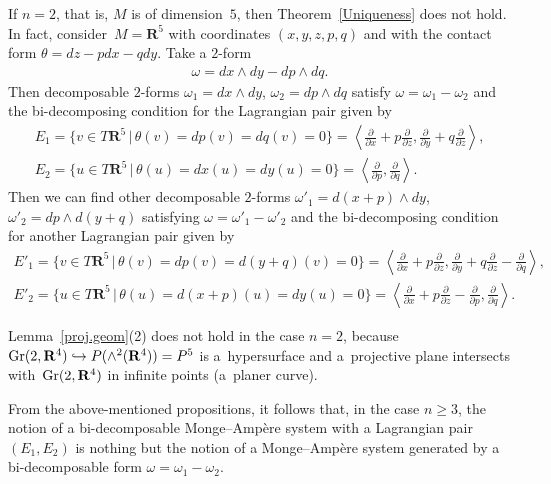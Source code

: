 \documentclass[pdftex]{sigma}
\begin{document}
\begin{Rem}
\label{n=2}
If $n=2$, that is, $M$ is of dimension~$5$,
then Theorem~\ref{Uniqueness} does not hold.
In fact, consider~$M={\mathbf{R}}^5$ with coordinates $(x,y,z,p,q)$
and with the contact form $\theta=dz-pdx-qdy$.
Take a $2$-form
\begin{gather*}
\omega=dx\wedge dy-dp\wedge dq.
\end{gather*}
Then decomposable $2$-forms $\omega_1 = dx\wedge dy$, $\omega_2=dp\wedge dq$
satisfy $\omega = \omega_1 - \omega_2$ and the bi-decomposing condition
for the Lagrangian pair given by
\begin{gather*}
E_1= \big\{ v \in T{\mathbf{R}}^5 \,|\, \theta(v) = dp(v) = dq(v) = 0 \big\}
= \left\langle \frac{\partial}{\partial x}+
p\frac{\partial}{\partial z},\frac{\partial}{\partial y}+
q\frac{\partial}{\partial z}\right\rangle,
\\
E_2= \big\{ u \in T{\mathbf{R}}^5 \,|\,
\theta(u) = dx(u) = dy(u) = 0\big\} = \left\langle \frac{\partial}{\partial p},
\frac{\partial}{\partial q}\right\rangle.
\end{gather*}
Then we can f\/ind other decomposable $2$-forms $\omega'_1=
d(x+p)\wedge dy$, $\omega'_2=dp\wedge d(y+q)$
satisfying $\omega=\omega'_1-\omega'_2$
and the bi-decomposing condition
for another Lagrangian pair given by
\begin{gather*}
E'_1  = \big\{ v \in T{\mathbf{R}}^5 \,|\, \theta(v) = dp(v) = d(y+q)(v) = 0\big\} =
\left\langle \frac{\partial}{\partial x}+p\frac{\partial}{\partial z},
\frac{\partial}{\partial y}+q\frac{\partial}{\partial z}-
\frac{\partial}{\partial q}\right\rangle,\\
E'_2  = \big\{ u \in T{\mathbf{R}}^5 \,|\, \theta(u) = d(x+p)(u) = dy(u) = 0 \big\}
= \left\langle \frac{\partial}{\partial x}+p\frac{\partial}{\partial z}-
\frac{\partial}{\partial p},\frac{\partial}{\partial q}\right\rangle.
\end{gather*}

Lemma~\ref{proj.geom}(2) does not hold in the case $n = 2$,
because ${\rm Gr}(2, {\mathbf{R}}^4) \hookrightarrow P(\wedge^2({\mathbf{R}}^4)) = P^5$
is a~hypersurface and a~projective plane intersects with~${\rm Gr}(2, {\mathbf{R}}^4)$
in inf\/inite points (a~planer curve).
\end{Rem}

From the above-mentioned propositions,
it follows that, in the case $n \geq 3$,
the notion of a bi-decomposable Monge--Amp{\`e}re system with a Lagrangian pair $(E_1,E_2)$
is nothing but
the notion of
a Monge--Amp{\`e}re system generated by a bi-decomposable
form $\omega=\omega_1-\omega_2$.
\end{document}
